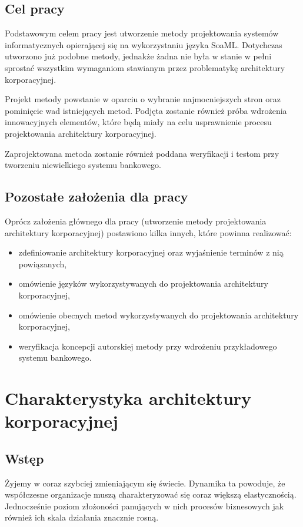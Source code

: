 \section{Cel pracy}
Podstawowym celem pracy jest utworzenie metody projektowania systemów informatycznych opierającej się na wykorzystaniu języka SoaML. Dotychczas utworzono już podobne metody, jednakże żadna nie była w stanie w pełni sprostać wszystkim wymaganiom stawianym przez problematykę architektury korporacyjnej.

Projekt metody powstanie w oparciu o wybranie najmocniejszych stron oraz pominięcie wad istniejących metod. Podjęta zostanie również próba wdrożenia innowacyjnych elementów, które będą miały na celu usprawnienie procesu projektowania architektury korporacyjnej.

Zaprojektowana metoda zostanie również poddana weryfikacji i testom przy tworzeniu niewielkiego systemu bankowego.

\section{Pozostałe założenia dla pracy}
Oprócz założenia głównego dla pracy (utworzenie metody projektowania architektury korporacyjnej) postawiono kilka innych, które powinna realizować:
\begin{itemize}
\item{zdefiniowanie architektury korporacyjnej oraz wyjaśnienie terminów z nią powiązanych,}
\item{omówienie języków wykorzystywanych do projektowania architektury korporacyjnej,}
\item{omówienie obecnych metod wykorzystywanych do projektowania architektury korporacyjnej,}
\item{weryfikacja koncepcji autorskiej metody przy wdrożeniu przykładowego systemu bankowego.}
\end{itemize}

\chapter{Charakterystyka architektury korporacyjnej}

\section{Wstęp}
Żyjemy w coraz szybciej zmieniającym się świecie. Dynamika ta powoduje, że współczesne organizacje muszą charakteryzować się coraz większą elastycznością. Jednocześnie poziom złożoności panujących w nich procesów biznesowych jak również ich skala działania znacznie rosną. \cite{SobArchKorpDobrPr}

